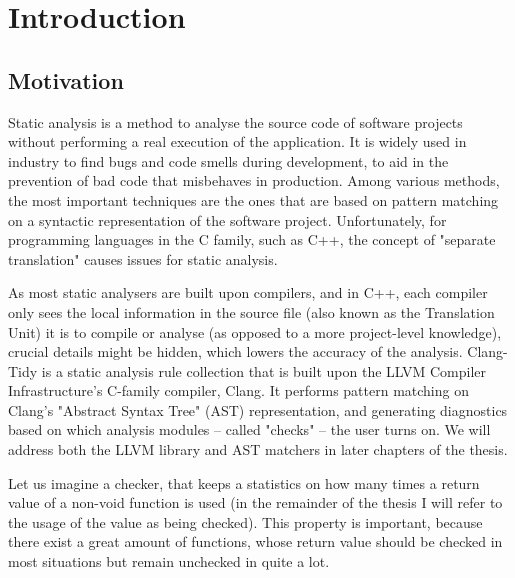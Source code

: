 \chapter{Introduction}
\label{ch:intro}

\section{Motivation}

Static analysis is a method to analyse the source code of software projects without performing a real execution of the application.
It is widely used in industry to find bugs and code smells during development, to aid in the prevention of bad code that misbehaves in
production.
Among various methods, the most important techniques are the ones that are based on pattern matching on a syntactic representation of
the software project.
Unfortunately, for programming languages in the C family, such as C++, the concept of "separate translation" causes issues for static
analysis.
\par As most static analysers are built upon compilers, and in C++, each compiler only sees the local information in the source file
(also known as the Translation Unit) it is to compile or analyse (as opposed to a more project-level knowledge), crucial details
might be hidden, which lowers the accuracy of the analysis. Clang-Tidy is a static analysis rule collection that is built upon
the LLVM Compiler Infrastructure's C-family compiler, Clang.
It performs pattern matching on Clang's "Abstract Syntax Tree" (AST) representation, and generating diagnostics based on which analysis
modules -- called "checks" -- the user turns on. We will address both the LLVM library and AST matchers in later chapters of the thesis.
\par Let us imagine a checker, that keeps a statistics on how many times a return value of a non-void function is used (in the remainder
of the thesis I will refer to the usage of the value as being checked). This property is important, because there exist a great amount of
functions, whose return value should be checked in most situations but remain unchecked in quite a lot.
